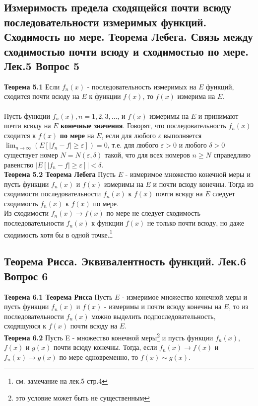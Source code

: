\documentclass{article}
\begin{document}
	
\subsection{Измеримость предела сходящейся почти всюду последовательности измеримых функций. Сходимость по мере. Теорема Лебега. Связь между сходимостью почти всюду и сходимостью по мере. Лек.5 \textbf{Вопрос 5}}
	\textbf{Теорема 5.1} Если ${{f}_{n}(x)}$ - последовательность измеримых на $E$ функций, сходится почти всюду на $E$ к функции $f(x)$, то $f(x)$ измерима на $E$.\\
	\\
	Пусть функции ${{f}_{n}(x)}, n=1,2,3,\ldots$, и $f(x)$ измеримы на $E$ и принимают почти всюду на $E$ \textbf{конечные значения}. Говорят, что последовательность ${{f}_{n}(x)}$ сходится к $f(x)$ \textbf{по мере} на $E$, если для любого $\varepsilon$ выполняется $\lim _{n \rightarrow \infty}\left(E\left[\left|f_{n}-f\right| \geq \varepsilon\right]\right)=0$, т.е. для любого $\varepsilon>0$ и любого $\delta>0$ существует номер $N=N(\varepsilon,\delta)$ такой, что для всех номеров $n\ge N$ справедливо равенство $|E\left[\left|f_{n}-f\right| \geq \varepsilon\right]|<\delta$.\\
	\textbf{Теорема 5.2 Теорема Лебега} Пусть $E$ - измеримое множество конечной меры и пусть функции ${{f}_{n}(x)}$ и $f(x)$ измеримы на $E$ и почти всюду конечны. Тогда из
	сходимости последовательности ${{f}_{n}(x)}$ к $f(x)$ почти всюду на $E$ следует сходимость ${{f}_{n}(x)}$ к $f(x)$ по мере.\\
	Из сходимости ${{f}_{n}(x)}\rightarrow f(x)$ по мере не следует сходимость последовательности ${{f}_{n}(x)}$ к функции $f(x)$ не только почти всюду, но даже сходимость хотя бы в одной точке.\footnote{см. замечание на лек.5 стр.4}\\
\subsection{Теорема Рисса. Эквивалентность функций. Лек.6 \textbf{Вопрос 6}}
	\textbf{Теорема 6.1 Теорема Рисса} Пусть $E$ - измеримое множество конечной меры и пусть функции ${{f}_{n}(x)}$ и $f(x)$ - измеримы и почти всюду конечны на $E$, то из последовательности ${{f}_{n}(x)}$ можно выделить подпоследовательность, сходящуюся к $f(x)$
	почти всюду на $E$.\\
	\textbf{Теорема 6.2} Пусть E - множество конечной меры\footnote{это условие может быть не существенным} и пусть функции ${{f}_{n}(x)}$, $f(x)$ и $g(x)$ почти всюду конечны. Тогда, если ${{f}_{n}(x)}\rightarrow f(x)$ и ${{f}_{n}(x)}\rightarrow g(x)$ по мере одновременно, то $f(x)\sim g(x)$.\\
\end{document}
